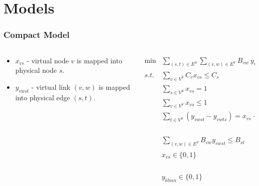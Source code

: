 \documentclass[english]{beamer}
\begin{document}
\section{Models}
\begin{frame}
\frametitle{Compact Model}
\pause
{
\begin{columns}
\begin{column}{0.35\textwidth}
  \begin{itemize}
    \item $x_{vs}$ - virtual node $v$ is mapped into physical node $s$.
    \item $y_{vwst}$ - virtual link $(v,w)$ is mapped into physical edge $(s,t)$.
  \end{itemize}
\end{column}
\pause
\begin{column}{0.7\textwidth}
\tiny
\begin{align}
     \min & \sum\limits_{(s,t) \in E^{S}} \sum\limits_{(v,w) \in E^{V}} B_{vw}~ y_{vwst} & \nonumber \\
    s.t. & \sum\limits_{v \in V^{V}} C_{v} x_{vs} \leq C_{s}                                   & \forall s \in V^{S}  \nonumber \\
         & \sum\limits_{s \in V^{S}} x_{vs} = 1                                                & \forall v \in V^{V}  \nonumber\\
         & \sum\limits_{v \in V^{V}} x_{vs} \leq 1                                             & \forall s \in V^{S} \nonumber \\
         & \sum\limits_{t \in V^{S}} ( y_{vwst} - y_{vwts}) = x_{vs} - x_{ws} & \forall (v,w) \in E^{V}, \nonumber \\ 
         &                                                                    & s \in V^{S} \nonumber \\
         & \sum\limits_{(v,w) \in E^{V}} B_{vw}  y_{vwst} \leq B_{st}                 & \forall (s,t) \in E^{S} \nonumber \\
         & x_{vs} \in \{0,1\}                                                                  & \forall v \in V^{V}, \nonumber \\
         &                                                                                      & s \in V^{S} \nonumber \\
         & y_{klmn} \in \{0,1\}                                                         & \forall (k,l) \in E^{V}, \nonumber \\
         &                                                                                 & (m,n) \in E^{S} \nonumber  
\end{align} 
\end{column}
\end{columns}
}
\end{frame}
\end{document}
